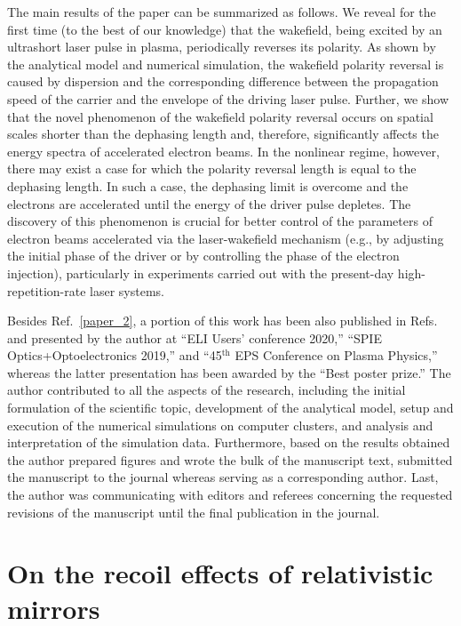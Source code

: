 \documentclass[10pt, a4paper, twoside, openright]{report}
\newcommand{\q}[1]{``#1''} %
\begin{document}
The main results of the paper can be summarized as follows. We reveal for the first time (to the best of our knowledge) that the wakefield, being excited by an ultrashort laser pulse in plasma, periodically reverses its polarity. As shown by the analytical model and numerical simulation, the wakefield polarity reversal is caused by dispersion and the corresponding difference between the propagation speed of the carrier and the envelope of the driving laser pulse. Further, we show that the novel phenomenon of the wakefield polarity reversal occurs on spatial scales shorter than the dephasing length and, therefore, significantly affects the energy spectra of accelerated electron beams. In the nonlinear regime, however, there may exist a case for which the polarity reversal length is equal to the dephasing length. In such a case, the dephasing limit is overcome and the electrons are accelerated until the energy of the driver pulse depletes. The discovery of this phenomenon is crucial for better control of the parameters of electron beams accelerated via the laser-wakefield mechanism (e.g., by adjusting the initial phase of the driver or by controlling the phase of the electron injection), particularly in experiments carried out with the present-day high-repetition-rate laser systems.

Besides Ref.~\ref{paper_2}, a portion of this work has been also published in Refs.~ and presented by the author at \q{ELI Users' conference 2020,} \q{SPIE Optics+Optoelectronics 2019,} and \q{45$ ^{\mathrm{th}} $ EPS Conference on Plasma Physics,} whereas the latter presentation has been awarded by the \q{Best poster prize.} The author contributed to all the aspects of the research, including the initial formulation of the scientific topic, development of the analytical model, setup and execution of the numerical simulations on computer clusters, and analysis and interpretation of the simulation data. Furthermore, based on the results obtained the author prepared figures and wrote the bulk of the manuscript text, submitted the manuscript to the journal whereas serving as a corresponding author. Last, the author was communicating with editors and referees concerning the requested revisions of the manuscript until the final publication in the journal.

\section{On the recoil effects of relativistic mirrors\label{sec:on_the_recoil_effects_of_relativistic_mirrors}}
%
\end{document}
